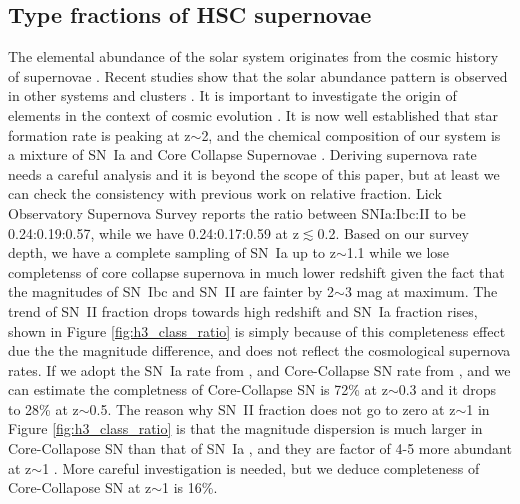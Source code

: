 \documentclass[useamsfonts]{pasj01}
\begin{document}
\subsection{Type fractions of HSC supernovae}
The elemental abundance of the solar system \citep{grevesse98a} originates from the cosmic history of 
supernovae \citep{maraston05a,kobayashi00a}.  
Recent studies show that the solar abundance pattern is observed in other systems \citep{ramirez09a}
and clusters \citep{mernier18a}.  It is important to investigate the origin of elements in the context
of cosmic evolution \citep{fukugita04}. 
It is now well established that star formation rate is peaking at z$\sim$2, and the chemical composition
of our system is a mixture of SN~Ia and Core Collapse Supernovae \citep{tsujimoto95a,kobayashi11a}.
Deriving supernova rate needs a careful analysis \citep{dilday08a,brown19a,frohmaier19a} and it is beyond the scope 
of this paper, but at least we can check the consistency with previous work on relative fraction.
Lick Observatory Supernova Survey \citep{li11a} reports the ratio between SNIa:Ibc:II to be 0.24:0.19:0.57, 
while we have 0.24:0.17:0.59 at z$\lesssim$0.2. 
Based on our survey depth, we have a complete sampling of SN~Ia up to z$\sim$1.1 while we lose
completenss of core collapse supernova in much lower redshift given the fact that the magnitudes of
SN~Ibc and SN~II are fainter by 2$\sim$3 mag at maximum.
The trend of SN~II fraction drops towards high redshift and SN~Ia fraction rises, shown in 
Figure \ref{fig:h3_class_ratio} is simply because of 
this completeness effect due the the magnitude difference, and does not reflect the cosmological 
supernova rates.
If we adopt the SN~Ia rate from \citet{graur14a}, and Core-Collapse SN rate from \citet{strolger15a},
and we can estimate the completness of Core-Collapse SN is 72\% at z$\sim$0.3 and it drops to 28\% at
z$\sim$0.5. 
The reason why SN~II fraction does not go to zero at z$\sim$1 in Figure \ref{fig:h3_class_ratio} is 
that the magnitude dispersion is much larger in Core-Collapose SN \citep[$\sigma$ $\sim$ 1.2 mag]{li11a,kessler19b} 
than that of SN~Ia \citep[$\sigma$ $\sim$ 0.5 mag]{rubin15a}, and they are factor of 4-5 more abundant 
at z$\sim$1 \citep{madau98a,hounsell18a}. 
More careful investigation is needed, but we deduce completeness of Core-Collapose SN at z$\sim$1 
is 16\%.

\end{document}
